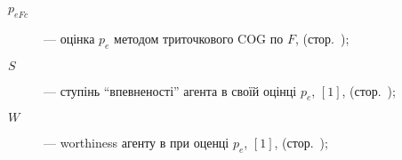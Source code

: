 \begin{description}
  \item[$p_{eFc} $]  ---
    оцінка $ p_e $ методом триточкового COG по $ F $,
    (стор.~\pageref{atu:eq:p_eFc});

  \item[$S$]  ---
  ступінь ``впевненості'' агента в своїй оцінці $ p_e $,
    $[1]$, (стор.~\pageref{atu:d:S});

  \item[$W$]  ---
    worthiness агенту в при оценці $p_e$,
    $[1]$, (стор.~\pageref{atu:d:W});



\end{description}



